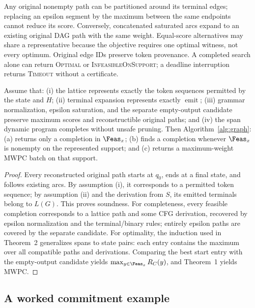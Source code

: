 Any original nonempty path can be partitioned around its terminal edges; replacing an epsilon segment by the maximum between the same endpoints cannot reduce its score. Conversely, concatenated saturated arcs expand to an existing original DAG path with the same weight. Equal-score alternatives may share a representative because the objective requires one optimal witness, not every optimum. Original edge IDs preserve token provenance. A completed search alone can return \textsc{Optimal} or \textsc{InfeasibleOnSupport}; a deadline interruption returns \textsc{Timeout} without a certificate.

\begin{theorem}
Assume that: (i) the lattice represents exactly the token sequences permitted by the state and $H$; (ii) terminal expansion represents exactly $\operatorname{emit}$; (iii) grammar normalization, epsilon saturation, and the separate empty-output candidate preserve maximum scores and reconstructible original paths; and (iv) the span dynamic program completes without unsafe pruning. Then Algorithm~\ref{alg:graph}: (a) returns only a completion in $\Feas_x$; (b) finds a completion whenever $\Feas_x$ is nonempty on the represented support; and (c) returns a maximum-weight MWPC batch on that support.
\end{theorem}

\begin{proof}
Every reconstructed original path starts at $q_0$, ends at a final state, and follows existing arcs. By assumption (i), it corresponds to a permitted token sequence; by assumption (ii) and the derivation from $S$, its emitted terminals belong to $L(G)$. This proves soundness. For completeness, every feasible completion corresponds to a lattice path and some CFG derivation, recovered by epsilon normalization and the terminal/binary rules; entirely epsilon paths are covered by the separate candidate. For optimality, the induction used in Theorem~2 generalizes spans to state pairs: each entry contains the maximum over all compatible paths and derivations. Comparing the best start entry with the empty-output candidate yields $\max_{y\in\Feas_x}R_C(y)$, and Theorem~1 yields MWPC.
\end{proof}


\subsection{A worked commitment example}

